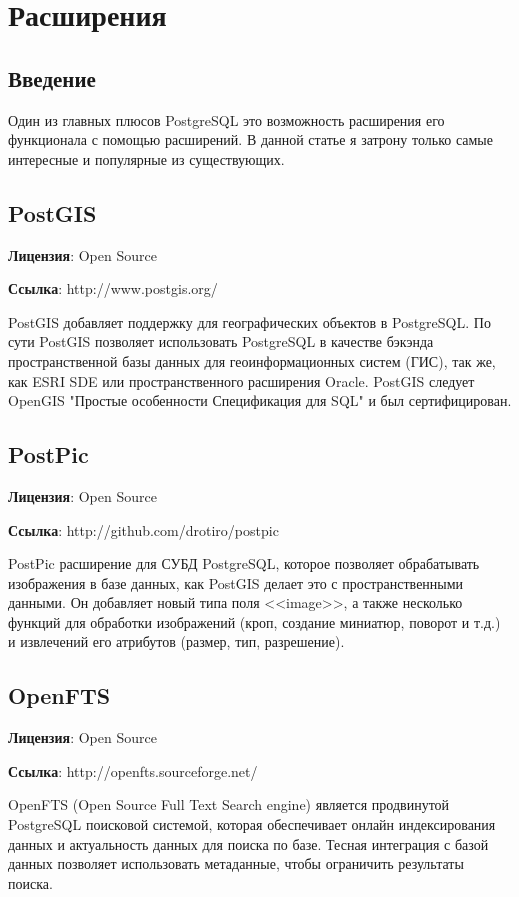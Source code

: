 \chapter{Расширения}
\begin{epigraphs}
\end{epigraphs}

\section{Введение}
Один из главных плюсов PostgreSQL это возможность расширения его функционала с помощью расширений. 
В данной статье я затрону только самые интересные и популярные из существующих. 

\section{PostGIS}
\textbf{Лицензия}: Open Source

\textbf{Ссылка}: http://www.postgis.org/

PostGIS добавляет поддержку для географических объектов в PostgreSQL. По сути PostGIS позволяет использовать PostgreSQL в качестве 
бэкэнда пространственной базы данных для геоинформационных систем (ГИС), так же, как ESRI SDE или пространственного расширения Oracle. 
PostGIS следует OpenGIS "Простые особенности Спецификация для SQL" и был сертифицирован.

\section{PostPic}
\textbf{Лицензия}: Open Source

\textbf{Ссылка}: http://github.com/drotiro/postpic

PostPic расширение для СУБД PostgreSQL, которое позволяет обрабатывать изображения в базе данных, как PostGIS делает это с пространственными данными.
Он добавляет новый типа поля <<image>>, а также несколько функций для обработки изображений (кроп, создание миниатюр, поворот и т.д.) и 
извлечений его атрибутов (размер, тип, разрешение).

\section{OpenFTS}
\textbf{Лицензия}: Open Source

\textbf{Ссылка}: http://openfts.sourceforge.net/

OpenFTS (Open Source Full Text Search engine) является продвинутой PostgreSQL поисковой системой, которая обеспечивает 
онлайн индексирования данных и актуальность данных для поиска по базе. Тесная интеграция с базой данных позволяет использовать метаданные, 
чтобы ограничить результаты поиска.

